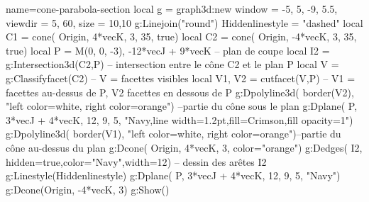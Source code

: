 \documentclass[varwidth, border = 3pt]{standalone}
\begin{document}
\begin{luadraw}{name=cone-parabola-section}
    local g = graph3d:new{
        window  = {-5, 5, -9, 5.5},
        viewdir = {5, 60},
        size    = {10,10}
    }
    g:Linejoin("round")
    Hiddenlinestyle = "dashed"
    local C1 = cone(
        Origin, 4*vecK, 3, 35,
        true)
    local C2 = cone(
        Origin, -4*vecK, 3, 35,
        true)
    local P = {M(0, 0, -3), -12*vecJ + 9*vecK} -- plan de coupe
    local I2 = g:Intersection3d(C2,P) -- intersection entre le cône C2 et le plan P
    local V = g:Classifyfacet(C2) -- V = facettes visibles
    local V1, V2 = cutfacet(V,P) -- V1 = facettes au-dessus de P, V2 facettes en dessous de P
    g:Dpolyline3d(
        border(V2),
        "left color=white, right color=orange") --partie du cône sous le plan
    g:Dplane(
        P, 3*vecJ + 4*vecK, 12, 9, 5,
        "Navy,line width=1.2pt,fill=Crimson,fill opacity=1")
    g:Dpolyline3d(
        border(V1),
        "left color=white, right color=orange")--partie du cône au-dessus du plan
    g:Dcone(
        Origin, 4*vecK, 3,
        {color="orange"})
    g:Dedges(
        I2,
        {hidden=true,color="Navy",width=12}) -- dessin des arêtes I2
    g:Linestyle(Hiddenlinestyle)
    g:Dplane(
        P, 3*vecJ + 4*vecK, 12, 9, 5,
        "Navy")
    g:Dcone(Origin, -4*vecK, 3)
    g:Show()
\end{luadraw}
\end{document}
